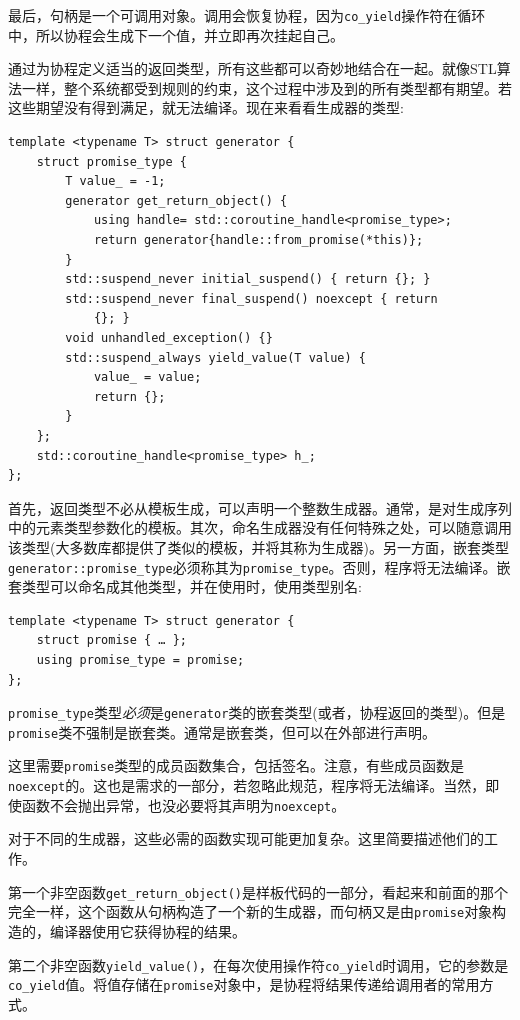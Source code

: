 最后，句柄是一个可调用对象。调用会恢复协程，因为\texttt{co\_yield}操作符在循环中，所以协程会生成下一个值，并立即再次挂起自己。 

通过为协程定义适当的返回类型，所有这些都可以奇妙地结合在一起。就像STL算法一样，整个系统都受到规则的约束，这个过程中涉及到的所有类型都有期望。若这些期望没有得到满足，就无法编译。现在来看看生成器的类型:

\begin{lstlisting}[style=styleCXX]
template <typename T> struct generator {
	struct promise_type {
		T value_ = -1;
		generator get_return_object() {
			using handle= std::coroutine_handle<promise_type>;
			return generator{handle::from_promise(*this)};
		}
		std::suspend_never initial_suspend() { return {}; }
		std::suspend_never final_suspend() noexcept { return 
			{}; }
		void unhandled_exception() {}
		std::suspend_always yield_value(T value) {
			value_ = value;
			return {};
		}
	};
	std::coroutine_handle<promise_type> h_;
};
\end{lstlisting}

首先，返回类型不必从模板生成，可以声明一个整数生成器。通常，是对生成序列中的元素类型参数化的模板。其次，命名生成器没有任何特殊之处，可以随意调用该类型(大多数库都提供了类似的模板，并将其称为生成器)。另一方面，嵌套类型\texttt{generator::promise\_type}必须称其为\texttt{promise\_type}。否则，程序将无法编译。嵌套类型可以命名成其他类型，并在使用时，使用类型别名:

\begin{lstlisting}[style=styleCXX]
template <typename T> struct generator {
	struct promise { … };
	using promise_type = promise;
};
\end{lstlisting}

\texttt{promise\_type}类型\textit{必须}是\texttt{generator}类的嵌套类型(或者，协程返回的类型)。但是\texttt{promise}类不强制是嵌套类。通常是嵌套类，但可以在外部进行声明。 

这里需要\texttt{promise}类型的成员函数集合，包括签名。注意，有些成员函数是\texttt{noexcept}的。这也是需求的一部分，若忽略此规范，程序将无法编译。当然，即使函数不会抛出异常，也没必要将其声明为\texttt{noexcept}。 

对于不同的生成器，这些必需的函数实现可能更加复杂。这里简要描述他们的工作。

第一个非空函数\texttt{get\_return\_object()}是样板代码的一部分，看起来和前面的那个完全一样，这个函数从句柄构造了一个新的生成器，而句柄又是由\texttt{promise}对象构造的，编译器使用它获得协程的结果。 

第二个非空函数\texttt{yield\_value()}，在每次使用操作符\texttt{co\_yield}时调用，它的参数是\texttt{co\_yield}值。将值存储在\texttt{promise}对象中，是协程将结果传递给调用者的常用方式。 

